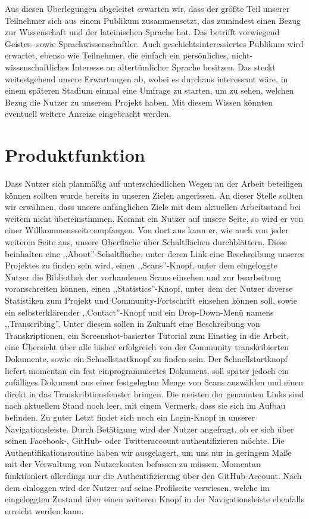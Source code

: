 \documentclass{article}
\begin{document}
Aus diesen Überlegungen abgeleitet erwarten wir, dass der größte Teil unserer Teilnehmer sich aus einem Publikum zusammensetzt,
das zumindest einen Bezug zur Wissenschaft und der lateinischen Sprache hat.
Das betrifft vorwiegend Geistes- sowie Sprachwissenschaftler. Auch geschichtsinteressiertes Publikum wird erwartet,
ebenso wie Teilnehmer, die einfach ein persönliches, nicht-wissenschaftliches Interesse an altertümlicher Sprache besitzen.
Das steckt weitestgehend unsere Erwartungen ab, wobei es durchaus interessant wäre, in einem späteren Stadium einmal eine Umfrage zu starten, um zu sehen, welchen Bezug die Nutzer zu unserem Projekt haben. Mit diesem Wissen könnten eventuell weitere Anreize eingebracht werden.

\section{Produktfunktion}
Dass Nutzer sich planmäßig auf unterschiedlichen Wegen an der Arbeit beteiligen können sollten wurde bereits in unseren Zielen angerissen.
An dieser Stelle sollten wir erwähnen,%
dass unsere anfänglichen Ziele mit dem aktuellen Arbeitsstand bei weitem nicht übereinstimmen.
Kommt ein Nutzer auf unsere Seite, so wird er von einer Willkommensseite empfangen.
Von dort aus kann er, wie auch von jeder weiteren Seite aus, unsere Oberfläche über Schaltflächen durchblättern.
Diese beinhalten eine ,,About''-Schaltfläche, unter deren Link eine Beschreibung unseres Projektes zu finden sein wird, einen ,,Scans''-Knopf,
unter dem eingeloggte Nutzer die Bibliothek der vorhandenen Scans einsehen und zur bearbeitung voranschreiten können, einen ,,Statistics''-Knopf,
unter dem der Nutzer diverse Statistiken zum Projekt und Community-Fortschritt einsehen können soll,
sowie ein selbsterklärender ,,Contact''-Knopf und ein Drop-Down-Menü namens ,,Transcribing''.
Unter diesem sollen in Zukunft eine Beschreibung von Transkriptionen, ein Screenshot-basiertes Tutorial zum Einstieg in die Arbeit,
eine Übersicht über alle bisher erfolgreich von der Community transkribierten Dokumente, sowie ein Schnellstartknopf zu finden sein.
Der Schnellstartknopf liefert momentan ein fest einprogrammiertes Dokument,
soll später jedoch ein zufälliges Dokument aus einer festgelegten Menge von Scans auswählen und einen direkt in das Transkribtionsfenster bringen.
Die meisten der genannten Links sind nach aktuellem Stand noch leer, mit einem Vermerk,
dass sie sich im Aufbau befinden. Zu guter Letzt findet sich noch ein Login-Knopf in unserer Navigationsleiste.
Durch Betätigung wird der Nutzer angefragt, ob er sich über seinen Facebook-, GitHub- oder Twitteraccount authentifizieren möchte.%
Die Authentifikationsroutine haben wir ausgelagert, um uns nur in geringem Maße mit der Verwaltung von Nutzerkonten befassen zu müssen.
Momentan funktioniert allerdings nur die Authentifizierung über den GitHub-Account.
Nach dem einloggen wird der Nutzer auf seine Profilseite verwiesen, welche im eingeloggten Zustand über einen weiteren Knopf
in der Navigationsleiste ebenfalls erreicht werden kann.
\end{document}
